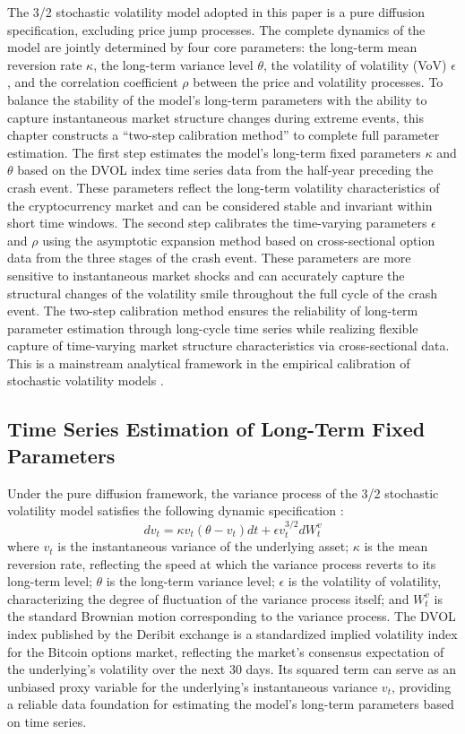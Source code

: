 The 3/2 stochastic volatility model adopted in this paper is a pure diffusion specification, excluding price jump processes. The complete dynamics of the model are jointly determined by four core parameters: the long-term mean reversion rate $\kappa$, the long-term variance level $\theta$, the volatility of volatility (VoV) $\epsilon$, and the correlation coefficient $\rho$ between the price and volatility processes. To balance the stability of the model's long-term parameters with the ability to capture instantaneous market structure changes during extreme events, this chapter constructs a ``two-step calibration method'' to complete full parameter estimation. The first step estimates the model's long-term fixed parameters $\kappa$ and $\theta$ based on the DVOL index time series data from the half-year preceding the crash event. These parameters reflect the long-term volatility characteristics of the cryptocurrency market and can be considered stable and invariant within short time windows. The second step calibrates the time-varying parameters $\epsilon$ and $\rho$ using the asymptotic expansion method based on cross-sectional option data from the three stages of the crash event. These parameters are more sensitive to instantaneous market shocks and can accurately capture the structural changes of the volatility smile throughout the full cycle of the crash event. The two-step calibration method ensures the reliability of long-term parameter estimation through long-cycle time series while realizing flexible capture of time-varying market structure characteristics via cross-sectional data. This is a mainstream analytical framework in the empirical calibration of stochastic volatility models \citet{andersenModelingForecastingRealized2003}.

\subsection{Time Series Estimation of Long-Term Fixed Parameters}

Under the pure diffusion framework, the variance process of the 3/2 stochastic volatility model satisfies the following dynamic specification \citet{baldeauxEXACTSIMULATION322012}:
\[
dv_t = \kappa v_t (\theta - v_t) dt + \epsilon v_t^{3/2} dW_t^v
\]
where $v_t$ is the instantaneous variance of the underlying asset; $\kappa$ is the mean reversion rate, reflecting the speed at which the variance process reverts to its long-term level; $\theta$ is the long-term variance level; $\epsilon$ is the volatility of volatility, characterizing the degree of fluctuation of the variance process itself; and $W_t^v$ is the standard Brownian motion corresponding to the variance process. The DVOL index published by the Deribit exchange is a standardized implied volatility index for the Bitcoin options market, reflecting the market's consensus expectation of the underlying's volatility over the next 30 days. Its squared term can serve as an unbiased proxy variable for the underlying's instantaneous variance $v_t$, providing a reliable data foundation for estimating the model's long-term parameters based on time series.

